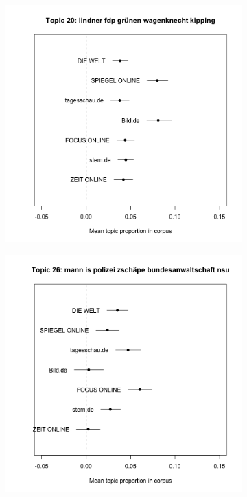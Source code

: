 \documentclass[12pt,a4paper,notitlepage]{article}
\begin{document}
\begin{figure}[H]
\begin{center}
\begin{subfigure}[normla]{0.3\textwidth}
		\end{subfigure}
				\begin{subfigure}[normla]{0.3\textwidth}
			\includegraphics[width=\textwidth]{../figs/estimate_effect20.png}
		\end{subfigure}
				\begin{subfigure}[normla]{0.3\textwidth}
			\includegraphics[width=\textwidth]{../figs/estimate_effect26.png}
		\end{subfigure}
	\end{center}
	\label{fig_estimateEffects_small}
\end{figure}
\end{document}
